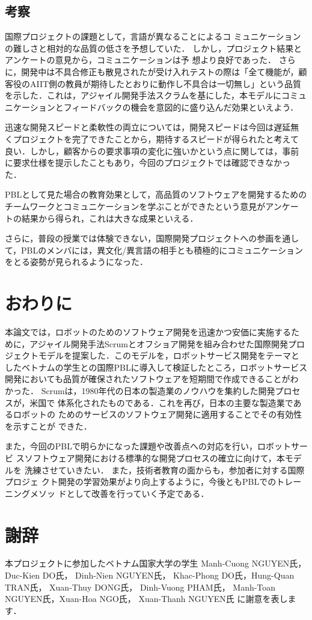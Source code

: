 \documentclass[a4j, 12Q, twocolumn, twoside]{jsarticle}
\begin{document}
\subsection{考察}

国際プロジェクトの課題として，言語が異なることによるコ
ミュニケーションの難しさと相対的な品質の低さを予想していた．
しかし，プロジェクト結果とアンケートの意見から，コミュニケーションは予
想より良好であった．
さらに，開発中は不具合修正も散見されたが受け入れテストの際は「全て機能が，顧客役のAIIT側の教員が期待したとおりに動作し不具合は一切無し」という品質を示した．これは，アジャイル開発手法スクラムを基にした，本モデルにコミュニケーションとフィードバックの機会を意図的に盛り込んだ効果といえよう．


迅速な開発スピードと柔軟性の両立については，開発スピードは今回は遅延無
くプロジェクトを完了できたことから，期待するスピードが得られたと考えて
良い．しかし，顧客からの要求事項の変化に強いかという点に関しては，事前
に要求仕様を提示したこともあり，今回のプロジェクトでは確認できなかっ
た．

PBLとして見た場合の教育効果として，高品質のソフトウェアを開発するための
チームワークとコミュニケーションを学ぶことができたという意見がアンケー
トの結果から得られ，これは大きな成果といえる．

さらに，普段の授業では体験できない，国際開発プロジェクトへの参画を通し
て，PBLのメンバには，異文化/異言語の相手とも積極的にコミュニケーション
をとる姿勢が見られるようになった．

\section{おわりに}\label{sec:concludion}
本論文では，ロボットのためのソフトウェア開発を迅速かつ安価に実施するた
めに，アジャイル開発手法Scrumとオフショア開発を組み合わせた国際開発プロ
ジェクトモデルを提案した．このモデルを，ロボットサービス開発をテーマと
したベトナムの学生との国際PBLに導入して検証したところ，ロボットサービス
開発においても品質が確保されたソフトウェアを短期間で作成できることがわ
かった．
Scrumは，1980年代の日本の製造業のノウハウを集約した開発プロセスが，米国で
体系化されたものである．これを再び，日本の主要な製造業であるロボットの
ためのサービスのソフトウェア開発に適用することでその有効性を示すことが
できた．

また，今回のPBLで明らかになった課題や改善点への対応を行い，ロボットサービ
スソフトウェア開発における標準的な開発プロセスの確立に向けて，本モデルを
洗練させていきたい． また，技術者教育の面からも，参加者に対する国際プロジェ
クト開発の学習効果がより向上するように，今後ともPBLでのトレーニングメソッ
ドとして改善を行っていく予定である．

\section*{謝辞}
本プロジェクトに参加したベトナム国家大学の学生
Manh-Cuong NGUYEN氏， Duc-Kien DO氏， Dinh-Nien NGUYEN氏，
Khac-Phong DO氏，Hung-Quan TRAN氏， Xuan-Thuy DONG氏，
Dinh-Vuong PHAM氏， Manh-Toan NGUYEN氏，Xuan-Hoa NGO氏， Xuan-Thanh NGUYEN氏
に謝意を表します．



\end{document}
